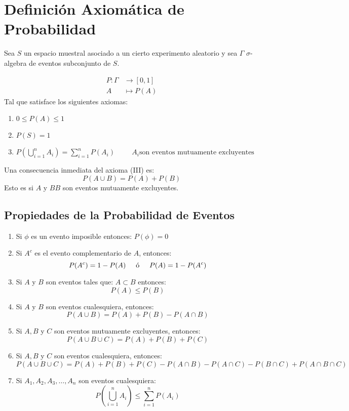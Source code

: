 \section{Definición Axiomática de Probabilidad}
Sea $S$ un espacio muestral asociado a un cierto experimento aleatorio y sea $\Gamma$ $\sigma$-algebra de eventos subconjunto de $S$.

\begin{align*}
  P \colon \Gamma &\to [0,1]\\
  A &\mapsto P(A)
\end{align*}
Tal que satisface los siguientes axiomas:
\begin{enumerate}[label=(\roman*)]
\item $0\leq P(A)\leq 1$
\item $P(S)=1$
\item $P\left( \bigcup\limits_{i=1}^{n} A_i\right)=
\displaystyle\sum_{i=1}^{n}P(A_i) \hspace{1cm}A_i \textrm{son eventos mutuamente excluyentes}$
\end{enumerate}
Una consecuencia inmediata del axioma (III) es:
$$P(A\cup B)=P(A)+P(B)$$
Esto es si $A$ y $BB$ son eventos mutuamente excluyentes.
\subsection{Propiedades de la Probabilidad de Eventos}
\begin{enumerate}
\item Si $\phi$ es un evento imposible entonces: $P(\phi)=0$
\item Si $A^c$ es el evento complementario de $A$, entonces:
$$P(A^c)=1-P(A) \hspace{0.5cm} \textrm{ó} \hspace{0.5cm}  P(A)=1-P(A^c)$$
\item Si $A$ y $B$ son eventos tales que: $A\subset B$ entonces:
$$P(A)\leq P(B)$$
\item Si $A$ y $B$ son eventos cualesquiera, entonces:
$$P(A\cup B)=P(A)+P(B)-P(A\cap B)$$
\item Si $A,B$ y $C$ son eventos mutuamente excluyentes, entonces:
$$P(A\cup B \cup C) = P(A)+P(B)+P(C)$$
\item Si $A,B$ y $C$ son eventos cualesquiera, entonces:
$$P(A\cup B \cup C) = P(A)+P(B)+P(C) - P(A\cap B)-P(A\cap C)-P(B\cap C)+P(A\cap B\cap C)$$
\item Si $A_1,A_2,A_3,\ldots,A_n$ son eventos cualesquiera:
$$ P\left( \bigcup\limits_{i=1}^{n} A_i\right)   \leq \sum_{i=1}^{n}P(A_i)$$
\end{enumerate}